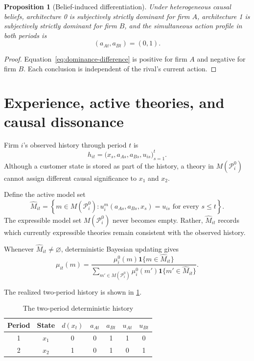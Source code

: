\documentclass[11pt]{article}
\newtheorem{proposition}{Proposition}
\newcommand{\ind}{\mathbf 1}
\newcommand{\emptysetset}{\varnothing}
\begin{document}
\begin{proposition}[Belief-induced differentiation]
Under heterogeneous causal beliefs, architecture 0 is subjectively strictly dominant for firm $A$, architecture 1 is subjectively strictly dominant for firm $B$, and the simultaneous action profile in both periods is
\[
(a_{At},a_{Bt})=(0,1).
\]
\end{proposition}

\begin{proof}
Equation~\eqref{eq:dominance-difference} is positive for firm $A$ and negative for firm $B$.  Each conclusion is independent of the rival's current action.
\end{proof}

\section{Experience, active theories, and causal dissonance}

Firm $i$'s observed history through period $t$ is
\[
h_{it}=\big(x_s,a_{As},a_{Bs},u_{is}\big)_{s=1}^t.
\]
Although a customer state is stored as part of the history, a theory in $M(\mathcal P_i^0)$ cannot assign different causal significance to $x_1$ and $x_2$.

Define the active model set
\begin{equation}
\widehat M_{it}
=
\left\{
m\in M(\mathcal P_i^0):
u_i^m(a_{As},a_{Bs},x_s)=u_{is}
\text{ for every }s\leq t
\right\}.
\label{eq:active-set}
\end{equation}
The expressible model set $M(\mathcal P_i^0)$ never becomes empty.  Rather, $\widehat M_{it}$ records which currently expressible theories remain consistent with the observed history.

Whenever $\widehat M_{it}\neq\emptysetset$, deterministic Bayesian updating gives
\begin{equation}
\mu_{it}(m)
=
\frac{
\mu_i^0(m)\ind\{m\in\widehat M_{it}\}
}{
\sum_{m'\in M(\mathcal P_i^0)}
\mu_i^0(m')\ind\{m'\in\widehat M_{it}\}
}.
\label{eq:bayes-update}
\end{equation}

The realized two-period history is shown in \cref{tab:history}.

\begin{table}[ht]
\centering
\caption{The two-period deterministic history}
\label{tab:history}
\renewcommand{\arraystretch}{1.15}
\begin{tabular}{@{}ccccccc@{}}
\toprule
Period & State & $d(x_t)$ & $a_{At}$ & $a_{Bt}$ & $u_{At}$ & $u_{Bt}$ \\
\midrule
1 & $x_1$ & 0 & 0 & 1 & 1 & 0 \\
2 & $x_2$ & 1 & 0 & 1 & 0 & 1 \\
\bottomrule
\end{tabular}
\end{table}
\end{document}
